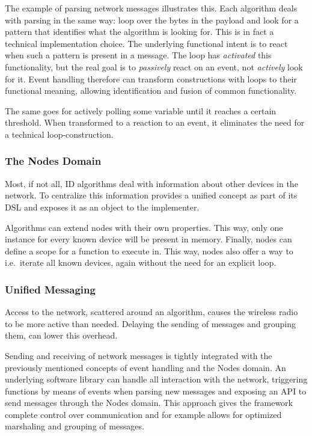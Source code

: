\documentclass[conference]{IEEEtran}
\begin{document}
The example of parsing network messages illustrates this. Each algorithm deals
with parsing in the same way: loop over the bytes in the payload and look for a
pattern that identifies what the algorithm is looking for. This is in fact a
technical implementation choice. The underlying functional intent is to react
when such a pattern is present in a message. The loop has \emph{activated} this
functionality, but the real goal is to \emph{passively} react on an event, not
\emph{actively} look for it. Event handling therefore can transform
constructions with loops to their functional meaning, allowing identification
and fusion of common functionality.

The same goes for actively polling some variable until it reaches a certain
threshold. When transformed to a reaction to an event, it eliminates the need
for a technical loop-construction.

\subsubsection{The Nodes Domain}

Most, if not all, ID algorithms deal with information about other devices in
the network. To centralize this information \NAME provides a unified
 concept as part of its DSL and exposes it as an object to the
implementer.

Algorithms can extend nodes with their own properties. This way, only one
instance for every known device will be present in memory. Finally, nodes can
define a scope for a function to execute in. This way, nodes also offer a way
to i.e.\ iterate all known devices, again without the need for an explicit loop.

\subsubsection{Unified Messaging}
\label{dsl-unified-msg}

Access to the network, scattered around an algorithm, causes the wireless radio
to be more active than needed. Delaying the sending of messages and grouping
them, can lower this overhead.

Sending and receiving of network messages is tightly integrated with the
previously mentioned concepts of event handling and the Nodes domain. An
underlying software library can handle all interaction with the network,
triggering functions by means of events when parsing new messages and exposing
an API to send messages through the Nodes domain. This approach gives the
framework complete control over communication and for example allows for
optimized marshaling and grouping of messages.
\end{document}
